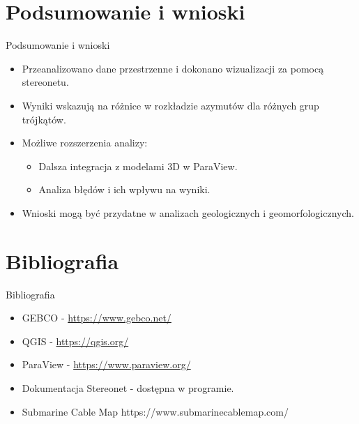 \documentclass{beamer}
\begin{document}
\section{Podsumowanie i wnioski}
\begin{frame}{Podsumowanie i wnioski}
    \begin{itemize}
        \item Przeanalizowano dane przestrzenne i dokonano wizualizacji za pomocą stereonetu.
        \item Wyniki wskazują na różnice w rozkładzie azymutów dla różnych grup trójkątów.
        \item Możliwe rozszerzenia analizy:
        \begin{itemize}
            \item Dalsza integracja z modelami 3D w ParaView.
            \item Analiza błędów i ich wpływu na wyniki.
        \end{itemize}
        \item Wnioski mogą być przydatne w analizach geologicznych i geomorfologicznych.
    \end{itemize}
\end{frame}

\section{Bibliografia}
\begin{frame}{Bibliografia}
    \begin{itemize}
        \item GEBCO - \url{https://www.gebco.net/}
        \item QGIS - \url{https://qgis.org/}
        \item ParaView - \url{https://www.paraview.org/}
        \item Dokumentacja Stereonet - dostępna w programie.
        \item Submarine Cable Map https://www.submarinecablemap.com/
    \end{itemize}
\end{frame}
\end{document}
